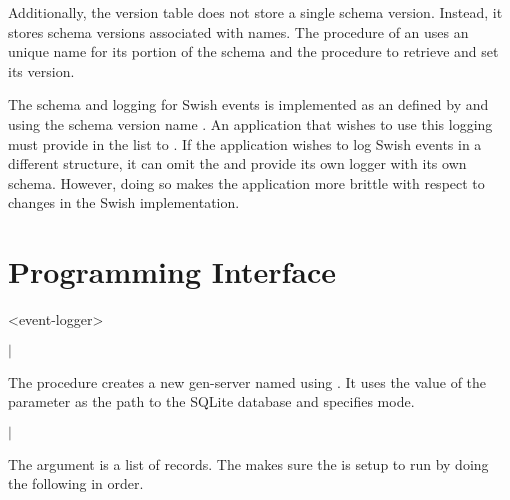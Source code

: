 Additionally, the version table does not store a single schema
version. Instead, it stores schema versions associated with names. The
 procedure of an  uses an unique
name for its portion of the schema and the 
procedure to retrieve and set its version.

The schema and logging for Swish events is implemented as an
 defined by  and
using the schema version name . An application that
wishes to use this logging must provide  in
the list to . If the application wishes to log
Swish events in a different structure, it can omit the
 and provide its own logger with its own
schema. However, doing so makes the application more brittle with
respect to changes in the Swish implementation.

\section {Programming Interface}

\begin{recorddef}{<event-logger>}
\end{recorddef}

\begin{procedure}
\end{procedure}
\returns{}
 $|$

The  procedure creates a new 
gen-server named  using . It
uses the value of the  parameter as the path to the
SQLite database and specifies  mode.

\begin{procedure}
\end{procedure}
\returns{}
 $|$

The argument  is a list of 
records. The  makes sure the  is
setup to run by doing the following in order.

